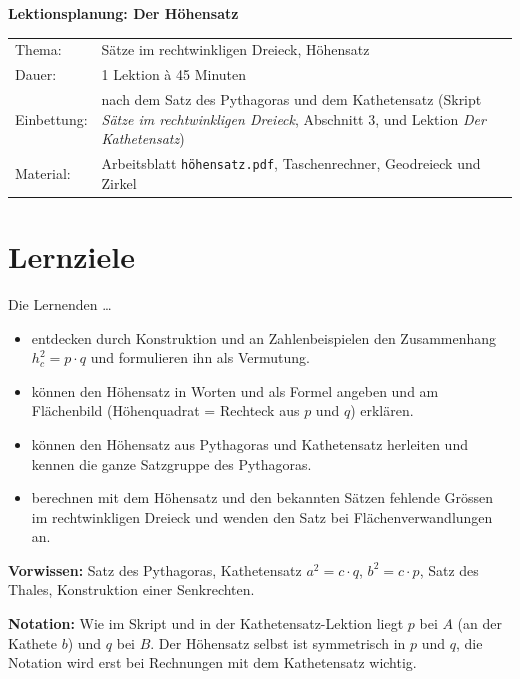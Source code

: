 \documentclass[11pt,oneside]{article}
\begin{document}
{\Large\textbf{Lektionsplanung: Der Höhensatz}}\\[2mm]
\begin{tabularx}{\textwidth}{@{}lX}
	Thema: & Sätze im rechtwinkligen Dreieck, Höhensatz\\
	Dauer: & 1 Lektion à 45 Minuten\\
	Einbettung: & nach dem Satz des Pythagoras und dem Kathetensatz (Skript \textit{Sätze im rechtwinkligen Dreieck}, Abschnitt 3, und Lektion \textit{Der Kathetensatz})\\
	Material: & Arbeitsblatt \texttt{höhensatz.pdf}, Taschenrechner, Geodreieck und Zirkel\\
\end{tabularx}

\section*{Lernziele}
Die Lernenden \ldots
\begin{itemize}[itemsep=0pt]
	\item entdecken durch Konstruktion und an Zahlenbeispielen den Zusammenhang $h_c^2=p\cdot q$ und formulieren ihn als Vermutung.
	\item können den Höhensatz in Worten und als Formel angeben und am Flächenbild (Höhenquadrat = Rechteck aus $p$ und $q$) erklären.
	\item können den Höhensatz aus Pythagoras und Kathetensatz herleiten und kennen die ganze Satzgruppe des Pythagoras.
	\item berechnen mit dem Höhensatz und den bekannten Sätzen fehlende Grössen im rechtwinkligen Dreieck und wenden den Satz bei Flächenverwandlungen an.
\end{itemize}

\textbf{Vorwissen:} Satz des Pythagoras, Kathetensatz $a^2=c\cdot q$, $b^2=c\cdot p$, Satz des Thales, Konstruktion einer Senkrechten.

\textbf{Notation:} Wie im Skript und in der Kathetensatz-Lektion liegt $p$ bei $A$ (an der Kathete $b$) und $q$ bei $B$. Der Höhensatz selbst ist symmetrisch in $p$ und $q$, die Notation wird erst bei Rechnungen mit dem Kathetensatz wichtig.
\end{document}
